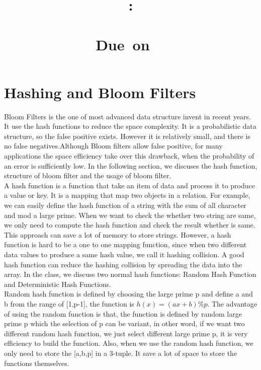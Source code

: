 \documentclass{article}
\title{
    \vspace{2in}
    \textmd{\textbf{\hmwkClass:\\\ \hmwkTitle}}\\
    \normalsize\vspace{0.1in}\small{Due\ on\ \hmwkDueDate\ }\\
    \vspace{0.1in}\large{\textit{\hmwkClassInstructor}}
    \vspace{3in}
}
\author{\textbf{\hmwkAuthorName}}
\date{}
\begin{document}
\maketitle
\newpage
\tableofcontents
\newpage

\section{Hashing and Bloom Filters}
Bloom Filters is the one of most advanced data structure invent in recent years. It use the hash functions to reduce the space complexity. It is a probabilistic data structure, so the false positive exists. However it is relatively small, and there is no false negatives.Although Bloom filters allow false positive, for many applications the space efficiency take over this drawback, when the probability of an error is sufficiently low. In the following section, we discuses the hash function, structure of bloom filter and the usage of bloom filter.\\

A hash function is a function that take an item of data and process it to produce a value or key. It is a mapping that map two objects in a relation. For example, we can easily define the hash function of a string with the sum of all character and mod a large prime. When we want to check the whether two string are same, we only need to compute the hash function and check the result whether is same. This approach can save a lot of memory to store strings. However, a hash function is hard to be a one to one mapping function, since when two different data values to produce a same hash value, we call it hashing collision. A good hash function can reduce the hashing collision by spreading the data into the array. In the class, we discuss two normal hash functions: Random Hash Function and Deterministic Hash Functions.\\

Random hash function is defined by choosing the large prime p and define a and b from the range of [1,p-1], the function is $h(x) = (ax+b) \%p$. The advantage of using the random function is that, the function is defined by random large prime p which the selection of p can be variant, in other word, if we want two different random hash function, we just select different large prime p, it is very efficiency to build the function.  Also, when we use the random hash function, we only need to store the [a,b,p] in a 3-tuple. It save a lot of space to store the functions themselves.\\
\end{document}
